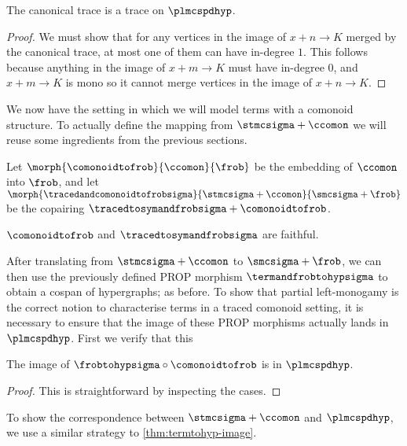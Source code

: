 \begin{proposition}
    The canonical trace is a trace on \(\plmcspdhyp\).
\end{proposition}
\begin{proof}
    We must show that for any vertices in the image
    of \(x + n \to K\) merged by the canonical trace, at most one of them can
    have in-degree \(1\).
    This follows because anything in the image of
    \(x + m \to K\) must have in-degree \(0\), and \(x + m \to K\) is
    mono so it cannot merge vertices in the image of \(x + n \to K\).
\end{proof}

We now have the setting in which we will model terms with a comonoid structure.
To actually define the mapping from \(\stmcsigma + \ccomon\) we will reuse
some ingredients from the previous sections.

\begin{definition}
    Let \(
    \morph{
        \comonoidtofrob
    }{
        \ccomon
    }{
        \frob
    }
    \) be the embedding of \(\ccomon\) into \(\frob\), and let \(
    \morph{
        \tracedandcomonoidtofrobsigma
    }{
        \stmcsigma + \ccomon
    }{
        \smcsigma + \frob
    }
    \) be the copairing \(\tracedtosymandfrobsigma + \comonoidtofrob\).
\end{definition}

\begin{corollary}
    \(\comonoidtofrob\) and \(\tracedtosymandfrobsigma\) are faithful.
\end{corollary}

After translating from \(\stmcsigma + \ccomon\) to \(\smcsigma + \frob\),
we can then use the previously defined PROP morphism \(\termandfrobtohypsigma\)
to obtain a cospan of hypergraphs; as before.
To show that partial left-monogamy is the correct notion to characterise terms
in a traced comonoid setting, it is necessary to ensure that the image of these
PROP morphisms actually lands in \(\plmcspdhyp\).
First we verify that this

\begin{lemma}
    The image of \(\frobtohypsigma \circ \comonoidtofrob\) is in
    \(\plmcspdhyp\).
\end{lemma}
\begin{proof}
    This is straightforward by inspecting the cases.
\end{proof}

To show the correspondence between \(\stmcsigma + \ccomon\) and
\(\plmcspdhyp\), we use a similar strategy to \cref{thm:termtohyp-image}.

